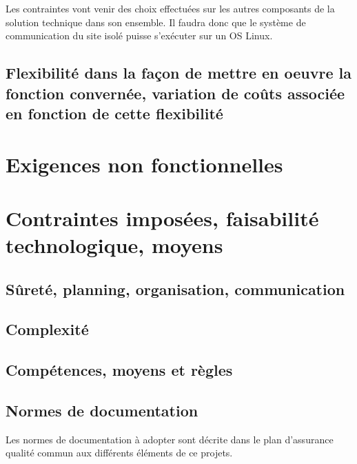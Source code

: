 Les contraintes vont venir des choix effectuées sur les autres composants de la solution technique dans son ensemble. Il faudra donc que le système de communication du site isolé puisse s'exécuter sur un OS Linux.


\subsection{Flexibilité dans la façon de mettre en oeuvre la fonction convernée, variation de coûts associée en fonction de cette flexibilité}

\section{Exigences non fonctionnelles}

\section{Contraintes imposées, faisabilité technologique, moyens}

\subsection{Sûreté, planning, organisation, communication}



\subsection{Complexité}



\subsection{Compétences, moyens et règles}



\subsection{Normes de documentation}

Les normes de documentation à adopter sont décrite dans le plan d'assurance qualité commun aux différents éléments de ce projets.

